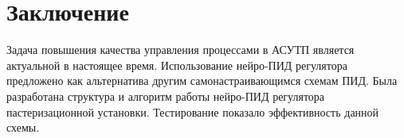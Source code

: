 \chapter{Заключение}

Задача повышения качества управления процессами в АСУТП является актуальной в настоящее время. Использование нейро-ПИД регулятора предложено как альтернатива другим самонастраивающимся схемам ПИД. Была разработана структура и алгоритм работы нейро-ПИД регулятора пастеризационной установки. Тестирование показало эффективность данной схемы.
